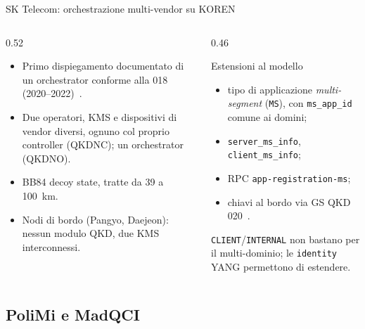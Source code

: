 \documentclass[10pt]{beamer}
\begin{document}
\begin{frame}{SK Telecom: orchestrazione multi-vendor su KOREN}
  \begin{columns}[T]
    \begin{column}{0.52\textwidth}
      \begin{itemize}\small
        \item Primo dispiegamento documentato di un orchestrator
              conforme alla 018 (2020–2022)~\cite{sim2023}.
        \item Due operatori, KMS e dispositivi di vendor diversi, ognuno
              col proprio controller (QKDNC); un orchestrator (QKDNO).
        \item BB84 decoy state, tratte da 39 a 100~km.
        \item \alert{Nodi di bordo} (Pangyo, Daejeon): nessun modulo QKD,
              due KMS interconnessi.
      \end{itemize}
    \end{column}
    \begin{column}{0.46\textwidth}
      \begin{block}{Estensioni al modello}
        \small
        \begin{itemize}
          \item tipo di applicazione \emph{multi-segment} (\texttt{MS}),
                con \texttt{ms\_app\_id} comune ai domini;
          \item \texttt{server\_ms\_info}, \texttt{client\_ms\_info};
          \item RPC \texttt{app-registration-ms};
          \item chiavi al bordo via GS QKD 020~\cite{qkd020}.
        \end{itemize}
      \end{block}
      \footnotesize \texttt{CLIENT}/\texttt{INTERNAL} non bastano per il
      multi-dominio; le \texttt{identity} YANG permettono di estendere.
    \end{column}
  \end{columns}
\end{frame}

\subsection{PoliMi e MadQCI}
\end{document}
